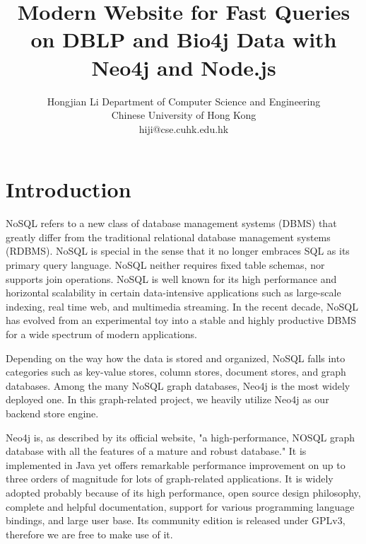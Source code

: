 \documentclass[10pt, conference, compsocconf]{IEEEtran}
\begin{document}
\title{Modern Website for Fast Queries on DBLP and Bio4j Data with Neo4j and Node.js} %
\author
{
\IEEEauthorblockN
{
Hongjian Li
\IEEEauthorblockA
{
Department of Computer Science and Engineering\\
Chinese University of Hong Kong\\
hiji@cse.cuhk.edu.hk
}
}
}
\maketitle








\section{Introduction}

NoSQL refers to a new class of database management systems (DBMS) that greatly differ from the traditional relational database management systems (RDBMS). NoSQL is special in the sense that it no longer embraces SQL as its primary query language. NoSQL neither requires fixed table schemas, nor supports join operations. NoSQL is well known for its high performance and horizontal scalability in certain data-intensive applications such as large-scale indexing, real time web, and multimedia streaming. In the recent decade, NoSQL has evolved from an experimental toy into a stable and highly productive DBMS for a wide spectrum of modern applications.

Depending on the way how the data is stored and organized, NoSQL falls into categories such as key-value stores, column stores, document stores, and graph databases. Among the many NoSQL graph databases, Neo4j \citep{eifrem2009neo4j} is the most widely deployed one. In this graph-related project, we heavily utilize Neo4j as our backend store engine.

Neo4j is, as described by its official website, "a high-performance, NOSQL graph database with all the features of a mature and robust database." It is implemented in Java yet offers remarkable performance improvement on up to three orders of magnitude for lots of graph-related applications. It is widely adopted probably because of its high performance, open source design philosophy, complete and helpful documentation, support for various programming language bindings, and large user base. Its community edition is released under GPLv3, therefore we are free to make use of it.
\end{document}
